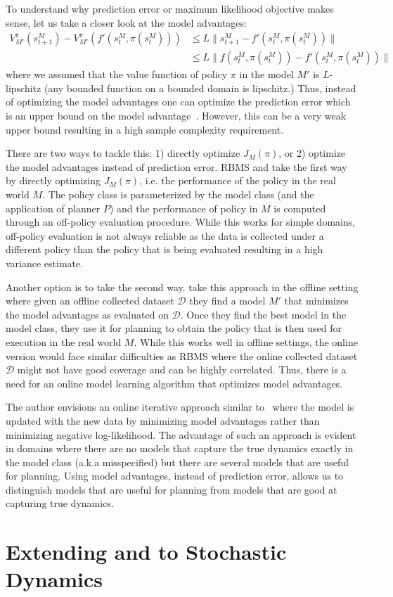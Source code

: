 To understand why prediction error or maximum likelihood objective
makes sense, let us take a
closer look at the model advantages:
\begin{align*}
  V_{M'}^\pi(s_{t+1}^M) - V^\pi_{M'}(f'(s_t^M, \pi(s_t^M))) &\leq
                                                              L\|s_{t+1}^M - f'(s_t^M, \pi(s_t^M))\| \\
  &\leq L\|f(s_t^M, \pi(s_t^M)) - f'(s_t^M, \pi(s_t^M))\|
\end{align*}
where we assumed that the value function of policy $\pi$ in the model
$M'$ is $L$-lipschitz (any bounded function on a bounded domain is
lipschitz.) Thus, instead of optimizing the model advantages one can
optimize the prediction error which is an upper bound on the
model advantage~\cite{DBLP:conf/icml/RossB12}. However, this can be a
very weak upper bound resulting in a high sample complexity
requirement.

There are two ways to tackle this: 1) directly optimize $J_{M}(\pi)$,
or 2) optimize the model advantages instead of prediction error. RBMS
and \taml{} take the first way by directly optimizing $J_M(\pi)$,
i.e. the performance of the policy in the real world $M$. The policy
class is parameterized by the model class (and the application of
planner $P$) and the performance of policy in $M$ is computed through
an off-policy evaluation procedure. While this works for simple
domains, off-policy evaluation is not always reliable as the data is
collected under a different policy than the policy that is being
evaluated resulting in a high variance estimate.

Another option is to take the second
way. \cite{DBLP:conf/aistats/VoloshinJY21} take this approach in the
offline setting where given an offline collected dataset $\mathcal{D}$
they find a model $M'$ that minimizes the model advantages as
evaluated on $\mathcal{D}$. Once they find the best model in the model
class, they use it for planning to obtain the policy that is then used
for execution in the real world $M$. While this works well in offline
settings, the online version would face similar difficulties as RBMS
where the online collected dataset $\mathcal{D}$ might not have good
coverage and can be highly correlated. Thus, there is a need for an
online model learning algorithm that optimizes model advantages.

The author envisions an online iterative approach similar
to~\cite{DBLP:conf/icml/RossB12} where the model is updated with the
new data by minimizing model advantages rather than minimizing
negative log-likelihood. The advantage of such an approach is evident
in domains where there are no models that capture the true dynamics
exactly in the model class (a.k.a misspecified) but there are several
models that are useful for planning. Using model advantages, instead
of prediction error, allows us to distinguish models that are useful
for planning from models that are good at capturing true dynamics.

\section{Extending \cmax{} and \cmaxpp{} to Stochastic Dynamics}
\label{sec:extend-cmax-cmaxpp}



